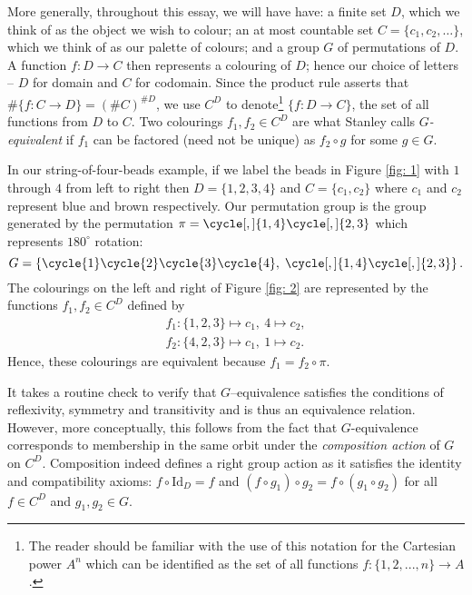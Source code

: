 \documentclass[a4paper,11pt]{article}
\numberwithin{equation}{section}
\begin{document}
    More generally, throughout this essay, we will have have: a finite set $D$, which we think of as the object we wish to colour; an at most countable set $C= \{c_1, c_2, \dots \}$, which we think of as our palette of colours; and a group $G$ of permutations of $D$. A function $f:D\to C$ then represents a colouring of $D$; hence our choice of letters -- $D$ for domain and $C$ for codomain. Since the product rule asserts that $\# \{f:C \to D\} = (\# C)^{\#D}$, we use $C^D$ to denote\footnote{The reader should be familiar with the use of this notation for the Cartesian power $A^n$ which can be identified as the set of all functions $f:\{1,2,...,n\} \to A$.} $\{f:D\to C\}$, the set of all functions from $D$ to $C$. Two colourings $f_1,f_2\in C^D$ are what Stanley \cite{stanley2013} calls \textit{$G$-equivalent} if $f_1$ can be factored (need not be unique) as $f_2 \circ g$ for some $g \in G$.  \smallskip
    
    In our string-of-four-beads example, if we label the beads in Figure \ref{fig: 1} with $1$ through $4$ from left to right then $D= \{1,2,3,4\}$ and $C=\{c_1, c_2\}$ where $c_1$ and $c_2$ represent blue and brown respectively. Our permutation group is the group generated by the permutation $\pi= \cycle[,]{1,4} \cycle[,]{2,3}$ which represents $180^\circ$ rotation:
    \begin{equation}
        \label{eq: example-group}
        G = \left \{ \cycle{1} \cycle{2} \cycle{3} \cycle{4} , \; \cycle[,]{1,4} \cycle[,]{2, 3} \right \}.
    \end{equation}
    The colourings on the left and right of Figure \ref{fig: 2} are represented by the functions $f_1,f_2\in C^D$ defined by 
    \begin{align*}
        f_1: \{1,2,3\} \mapsto c_1,\ 4 \mapsto c_2, \\
	    f_2: \{4,2,3\} \mapsto c_1,\ 1 \mapsto c_2.
    \end{align*}Hence, these colourings are equivalent because $f_1 = f_2 \circ \pi$.  \smallskip
    
    It takes a routine check to verify that $G$--equivalence satisfies the conditions of reflexivity, symmetry and transitivity and is thus an equivalence relation. However, more conceptually, this follows from the fact that \(G\)-equivalence corresponds to membership in the same orbit under the \textit{composition action} of \(G\) on \(C^D\). Composition indeed defines a right group action as it satisfies the identity and compatibility axioms: \(f\circ \text{Id}_D = f\) and \((f\circ g_1)\circ g_2 = f\circ (g_1\circ g_2) \) for all $f\in C^D$ and $g_1, g_2 \in G$. \smallskip
 
\end{document}
